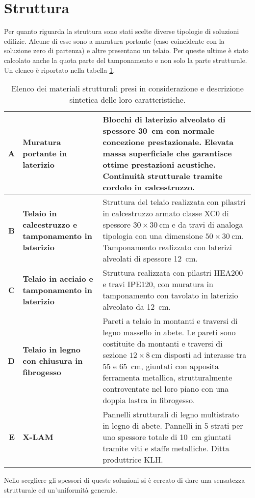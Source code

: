 \section{Struttura}
Per quanto riguarda la struttura sono stati scelte diverse tipologie di soluzioni edilizie. 
Alcune di esse sono a muratura portante (caso coincidente con la soluzione zero di partenza) e altre presentano un telaio. 
Per queste ultime è stato calcolato anche la quota parte del tamponamento e non solo la parte strutturale. 
Un elenco è riportato nella tabella \ref{MaterialiStruttura}.
\begin{table}[htbp]
\caption{Elenco dei materiali strutturali presi in considerazione e descrizione sintetica delle loro caratteristiche.}
\label{MaterialiStruttura}
\centering
\begin{tabularx}{\textwidth}{rXX}
    \toprule
        \textbf{A} & \textbf{Muratura portante in laterizio} & Blocchi di laterizio alveolato di spessore \SI{30}{\centi\meter} con normale concezione prestazionale. 
        Elevata massa superficiale che garantisce ottime prestazioni acustiche. Continuità strutturale tramite cordolo in calcestruzzo.\\\midrule
        \textbf{B} & \textbf{Telaio in calcestruzzo e tamponamento in laterizio} & Struttura del telaio realizzata con pilastri in calcestruzzo armato classe XC0 di spessore $30\times\SI{30}{\centi\meter}$ e da travi di analoga tipologia con una dimensione $50\times\SI{30}{\centi\meter}$. Tamponamento realizzato con laterizi alveolati di spessore \SI{12}{\centi\meter}. \\\midrule
        \textbf{C} & \textbf{Telaio in acciaio e tamponamento in laterizio} & Struttura realizzata con pilastri HEA200 e travi IPE120, con muratura in tamponamento con tavolato in laterizio alveolato da \SI{12}{\centi\meter}.\\\midrule
        \textbf{D} & \textbf{Telaio in legno con chiusura in fibrogesso} & Pareti a telaio in montanti e traversi di legno massello in abete. Le pareti sono costituite da montanti e traversi di sezione $12 \times \SI{8}{\centi\meter}$ disposti ad interasse tra $55$ e \SI{65}{\centi\meter}, giuntati con apposita ferramenta metallica, strutturalmente controventate nel loro piano con una doppia lastra in fibrogesso. \\\midrule
        \textbf{E} & \textbf{X-LAM} & Pannelli strutturali di legno multistrato \xlam{} in legno di abete. Pannelli in 5 strati per uno spessore totale di \SI{10}{\centi\meter} giuntati tramite viti e staffe metalliche. Ditta produttrice KLH.\\
    \bottomrule
\end{tabularx}
\end{table}
Nello scegliere gli spessori di queste soluzioni si è cercato di dare una sensatezza strutturale ed un'uniformità generale.

